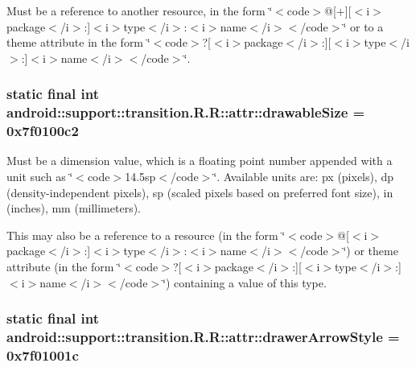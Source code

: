 Must be a reference to another resource, in the form \char`\"{}$<$code$>$@\mbox{[}+\mbox{]}\mbox{[}$<$i$>$package$<$/i$>$:\mbox{]}$<$i$>$type$<$/i$>$:$<$i$>$name$<$/i$>$$<$/code$>$\char`\"{} or to a theme attribute in the form \char`\"{}$<$code$>$?\mbox{[}$<$i$>$package$<$/i$>$:\mbox{]}\mbox{[}$<$i$>$type$<$/i$>$:\mbox{]}$<$i$>$name$<$/i$>$$<$/code$>$\char`\"{}. \hypertarget{classandroid_1_1support_1_1transition_1_1_r_1_1attr_7bd9721bc40ab37fd43f9151b9e02fd3}{
\subsubsection[{drawableSize}]{\setlength{\rightskip}{0pt plus 5cm}static final int android::support::transition.R.R::attr::drawableSize = 0x7f0100c2}}
\label{classandroid_1_1support_1_1transition_1_1_r_1_1attr_7bd9721bc40ab37fd43f9151b9e02fd3}


Must be a dimension value, which is a floating point number appended with a unit such as \char`\"{}$<$code$>$14.5sp$<$/code$>$\char`\"{}. Available units are: px (pixels), dp (density-independent pixels), sp (scaled pixels based on preferred font size), in (inches), mm (millimeters). 

This may also be a reference to a resource (in the form \char`\"{}$<$code$>$@\mbox{[}$<$i$>$package$<$/i$>$:\mbox{]}$<$i$>$type$<$/i$>$:$<$i$>$name$<$/i$>$$<$/code$>$\char`\"{}) or theme attribute (in the form \char`\"{}$<$code$>$?\mbox{[}$<$i$>$package$<$/i$>$:\mbox{]}\mbox{[}$<$i$>$type$<$/i$>$:\mbox{]}$<$i$>$name$<$/i$>$$<$/code$>$\char`\"{}) containing a value of this type. \hypertarget{classandroid_1_1support_1_1transition_1_1_r_1_1attr_758067761e5929030917ee0c2d6def12}{
\subsubsection[{drawerArrowStyle}]{\setlength{\rightskip}{0pt plus 5cm}static final int android::support::transition.R.R::attr::drawerArrowStyle = 0x7f01001c}}
\label{classandroid_1_1support_1_1transition_1_1_r_1_1attr_758067761e5929030917ee0c2d6def12}


